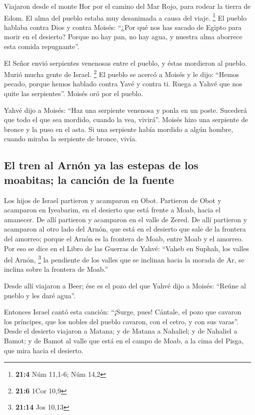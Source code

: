  Viajaron desde el monte Hor por el camino del Mar Rojo,
para rodear la tierra de Edom. El alma del pueblo estaba muy desanimada
a causa del viaje. \footnote{\textbf{21:4} Núm 11,1-6; Núm 14,2}
 El pueblo hablaba contra Dios y contra Moisés: ``¿Por qué
nos has sacado de Egipto para morir en el desierto? Porque no hay pan,
no hay agua, y nuestra alma aborrece esta comida repugnante''.

 El Señor envió serpientes venenosas entre el pueblo, y
éstas mordieron al pueblo. Murió mucha gente de Israel. \footnote{\textbf{21:6}
  1Cor 10,9}  El pueblo se acercó a Moisés y le dijo:
``Hemos pecado, porque hemos hablado contra Yavé y contra ti. Ruega a
Yahvé que nos quite las serpientes''. Moisés oró por el pueblo.

 Yahvé dijo a Moisés: ``Haz una serpiente venenosa y ponla
en un poste. Sucederá que todo el que sea mordido, cuando la vea,
vivirá''.  Moisés hizo una serpiente de bronce y la puso
en el asta. Si una serpiente había mordido a algún hombre, cuando miraba
la serpiente de bronce, vivía.

\hypertarget{el-tren-al-arnuxf3n-ya-las-estepas-de-los-moabitas-la-canciuxf3n-de-la-fuente}{%
\subsection{El tren al Arnón ya las estepas de los moabitas; la canción
de la
fuente}\label{el-tren-al-arnuxf3n-ya-las-estepas-de-los-moabitas-la-canciuxf3n-de-la-fuente}}

 Los hijos de Israel partieron y acamparon en Obot.
 Partieron de Obot y acamparon en Iyeabarim, en el
desierto que está frente a Moab, hacia el amanecer.  De
allí partieron y acamparon en el valle de Zered.  De allí
partieron y acamparon al otro lado del Arnón, que está en el desierto
que sale de la frontera del amorreo; porque el Arnón es la frontera de
Moab, entre Moab y el amorreo.  Por eso se dice en el
Libro de las Guerras de Yahvé: ``Vaheb en Suphah, los valles del Arnón,
\footnote{\textbf{21:14} Jos 10,13}  la pendiente de los
valles que se inclinan hacia la morada de Ar, se inclina sobre la
frontera de Moab.''

 Desde allí viajaron a Beer; ése es el pozo del que Yahvé
dijo a Moisés: ``Reúne al pueblo y les daré agua''.

 Entonces Israel cantó esta canción: ``¡Surge, pues!
Cántale,  el pozo que cavaron los príncipes, que los
nobles del pueblo cavaron, con el cetro, y con sus varas''. Desde el
desierto viajaron a Matana;  y de Matana a Nahaliel; y de
Nahaliel a Bamot;  y de Bamot al valle que está en el
campo de Moab, a la cima del Pisga, que mira hacia el desierto.

